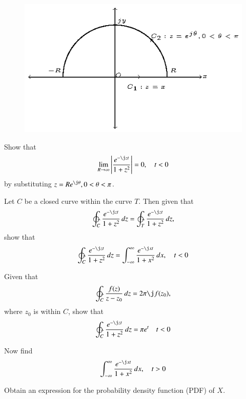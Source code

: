 \documentclass[journal,12pt,twocolumn]{IEEEtran}
\begin{document}
%
\begin{figure}[!h]
\centering
\includegraphics[width=\columnwidth]{./figs/contour.eps}
\caption{}
\label{fig:contour}
\end{figure}
%

%
\begin{problem}
Show that
\begin{equation}
\lim_{R\to \infty}\abs{ \frac{e^{-\j zt}}{1+z^2}} = 0, \quad t < 0
\end{equation}
by substituting $z = Re^{\j \theta}, 0 < \theta < \pi$.
\end{problem}
%
\begin{problem}
Let $C$ be a closed curve within the curve $T$.  Then given that
\begin{equation}
\ointctrclockwise_C \frac{e^{-\j zt}}{1+z^2}\,dz = \ointctrclockwise_T \frac{e^{-\j zt}}{1+z^2}\,dz,
\end{equation}
show that
\begin{equation}
\ointctrclockwise_C \frac{e^{-\j zt}}{1+z^2}\,dz = \int_{-\infty}^{\infty} \frac{e^{-\j x t}}{1+x^2}\,dx, \quad t < 0
\end{equation}
\end{problem}
\begin{problem}
Given that
\begin{equation}
\ointctrclockwise_C \frac{f(z)}{z-z_0}\,dz = 2\pi \j f(z_0), 
\end{equation}
%
where $z_0$ is within $C$, show that
\begin{equation}
\ointctrclockwise_C \frac{e^{-\j zt}}{1+z^2}\,dz = \pi e^t \quad t < 0
\end{equation}
\end{problem}
\begin{problem}
Now find 
\begin{equation}
\int_{-\infty}^{\infty} \frac{e^{-\j x t}}{1+x^2}\,dx, \quad t > 0
\end{equation}
\end{problem}
%
\begin{problem}
Obtain an expression for the probability density function (PDF) of $X$.
\end{problem}
\end{document}
